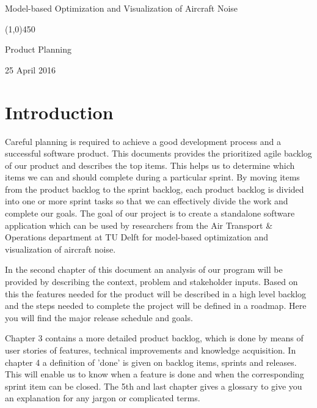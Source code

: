\documentclass[a4paper,english,fleqn]{exam}
\newcommand{\cMysename}{Model-based Optimization and Visualization of Aircraft Noise}
\newcommand{\doctitle}{Product Planning }
\newcommand{\deadline}{25 April 2016}
\newcommand{\examdate}{\deadline}
\begin{document}
\thispagestyle{empty}

\begin{center}

\vspace*{2cm}
{\huge \cMysename}

\begin{center}
    \line(1,0){450}
\end{center}

{\LARGE \doctitle}

\vspace{1cm}

{\Large \examdate}

\end{center}
\newpage

\tableofcontents
\newpage

\section{Introduction}

Careful planning is required to achieve a good development process and a successful software product. This documents provides the prioritized agile backlog of our product and describes the top items. This helps us to determine which items we can and should complete during a particular sprint. By moving items from the product backlog to the sprint backlog, each product backlog is divided into one or more sprint tasks so that we can effectively divide the work and complete our goals. The goal of our project is to create a standalone software application which can be used by researchers from the Air Transport \& Operations department at TU Delft for model-based optimization and visualization of aircraft noise.

In the second chapter of this document an analysis of our program will be provided by describing the context, problem and stakeholder inputs. Based on this the features needed for the product will be described in a high level backlog and the steps needed to complete the project will be defined in a roadmap. Here you will find the major release schedule and goals.

Chapter 3 contains a more detailed product backlog, which is done by means of user stories of features, technical improvements and knowledge acquisition. In chapter 4 a definition of 'done' is given on backlog items, sprints and releases. This will enable us to know when a feature is done and when the corresponding sprint item can be closed. The 5th and last chapter gives a glossary to give you an explanation for any jargon or complicated terms.
\end{document}
